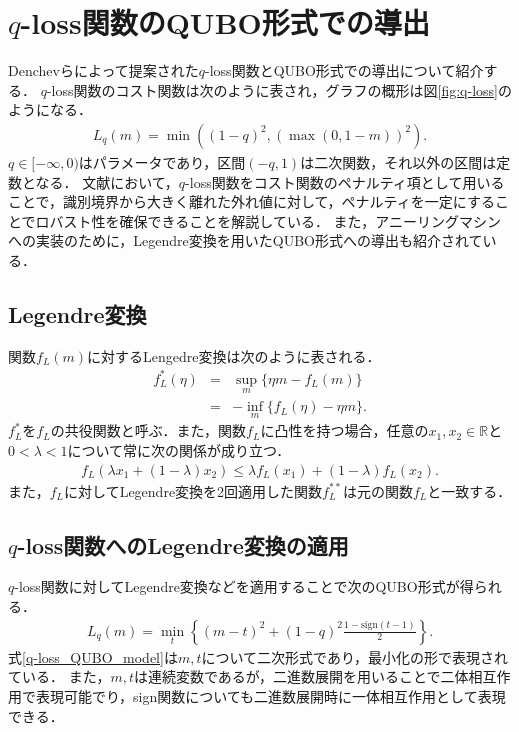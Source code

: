 \documentclass[technicalreport]{ieicej}
\begin{document}
\section{$q$-loss関数のQUBO形式での導出}
Denchevらによって提案された$q$-loss関数とQUBO形式での導出について紹介する．
$q$-loss関数のコスト関数は次のように表され，グラフの概形は図\ref{fig:q-loss}のようになる．
\begin{eqnarray}
  L_{q}(m)=\min{\left((1-q)^{2},(\max{(0,1-m)})^{2}\right)}. \label{q-loss_cost_function}
\end{eqnarray}
$q\in [-\infty ,0)$はパラメータであり，区間$(-q,1)$は二次関数，それ以外の区間は定数となる．
文献\cite{q-loss_formulation}において，$q$-loss関数をコスト関数のペナルティ項として用いることで，識別境界から大きく離れた外れ値に対して，ペナルティを一定にすることでロバスト性を確保できることを解説している．
また，アニーリングマシンへの実装のために，Legendre変換を用いたQUBO形式への導出も紹介されている．

\subsection{Legendre変換}
関数$f_{L}(m)$に対するLengedre変換は次のように表される．
\begin{eqnarray}
  f^{*}_{L}(\eta)&=&\sup_{m}{\{\eta m-f_{L}(m)\}} \nonumber \\
  &=& -\inf_{m}{\{f_{L}(\eta)-\eta m\}}.
\end{eqnarray}
$f^{*}_{L}$を$f_{L}$の共役関数と呼ぶ．また，関数$f_{L}$に凸性を持つ場合，任意の$x_{1},x_{2}\in\mathbb{R}$と$0<\lambda <1$について常に次の関係が成り立つ．
\begin{eqnarray}
  f_{L}(\lambda x_{1}+(1-\lambda)x_{2})\leq\lambda f_{L}(x_{1})+(1-\lambda)f_{L}(x_{2}).
\end{eqnarray}
また，$f_{L}$に対してLegendre変換を2回適用した関数$f^{**}_{L}$は元の関数$f_{L}$と一致する．

\subsection{$q$-loss関数へのLegendre変換の適用}
$q$-loss関数に対してLegendre変換などを適用することで次のQUBO形式が得られる．
\begin{eqnarray}
  L_{q}(m)=\min_{t}{\left\{(m-t)^{2}+(1-q)^{2}\frac{1-\textrm{sign}(t-1)}{2}\right\}}. \label{q-loss_QUBO_model}
\end{eqnarray}
式\ref{q-loss_QUBO_model}は$m,t$について二次形式であり，最小化の形で表現されている．
また，$m,t$は連続変数であるが，二進数展開を用いることで二体相互作用で表現可能でり，sign関数についても二進数展開時に一体相互作用として表現できる．
\end{document}
